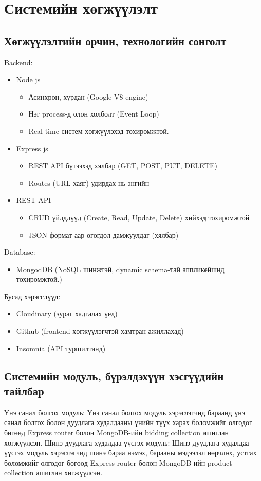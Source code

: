 \chapter{Системийн хөгжүүлэлт}
\label{Chapter3}

\section{Хөгжүүлэлтийн орчин, технологийн сонголт}
Backend:
\begin{itemize}
    \item Node js 
    \begin{itemize}
   \item Асинхрон, хурдан (Google V8 engine)
   \item Нэг process-д олон холболт (Event Loop)
   \item Real-time систем хөгжүүлэхэд тохиромжтой.
\end{itemize}
    \item Express js
    \begin{itemize}
   \item REST API бүтээхэд хялбар (GET, POST, PUT, DELETE)
   \item Routes (URL хаяг) удирдах нь энгийн
\end{itemize}
    \item REST API
    \begin{itemize}
   \item CRUD үйлдлүүд (Create, Read, Update, Delete) хийхэд тохиромжтой
   \item JSON формат-аар өгөгдөл дамжуулдаг (хялбар)
\end{itemize}
\end{itemize}
Database:
\begin{itemize}
    \item MongodDB  (NoSQL шинжтэй, dynamic schema-тай аппликейшнд тохиромжтой.)
\end{itemize}

 Бусад хэрэгслүүд:
 \begin{itemize}
    \item Cloudinary (зураг хадгалах үед)
    \item Github (frontend хөгжүүлэгчтэй хамтран ажиллахад)
    \item Insomnia (API туршилтанд)
\end{itemize}

\section{Системийн модуль, бүрэлдэхүүн хэсгүүдийн тайлбар}
Үнэ санал болгох модуль:
 Үнэ санал болгох модуль хэрэглэгчид бараанд үнэ санал болгох болон  дуудлага худалдааны үнийн түүх харах боломжийг олгодог бөгөөд Express router болон MongoDB-ийн bidding collection ашиглан хөгжүүлсэн.
\newline 
Шинэ дуудлага худалдаа үүсгэх модуль:
 Шинэ дуудлага худалдаа үүсгэх модуль хэрэглэгчид шинэ бараа нэмэх, барааны мэдээлэл өөрчлөх, устгах боломжийг олгодог бөгөөд Express router болон MongoDB-ийн product collection ашиглан хөгжүүлсэн.

